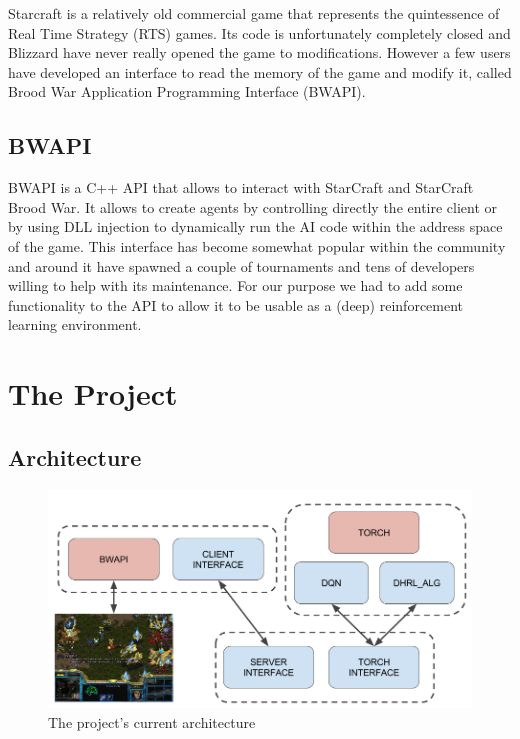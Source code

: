 \documentclass[bsc,frontabs,twoside,singlespacing,parskip,deptreport]{infthesis}     %
\begin{document}
Starcraft is a relatively old commercial game that represents the quintessence
of Real Time Strategy (RTS) games. Its code is unfortunately completely closed
and Blizzard have never really opened the game to modifications. However a few
users have developed an interface to read the memory of the game and modify it,
called Brood War Application Programming Interface (BWAPI).

\section{BWAPI}

BWAPI is a C++ API that allows to interact with StarCraft and StarCraft Brood
War. It allows to create agents by controlling directly the entire client or by
using DLL injection to dynamically run the AI code within the address space of
the game. This interface has become somewhat popular within the community and
around it have spawned a couple of tournaments and tens of developers willing to
help with its maintenance. For our purpose we had to add some functionality to
the API to allow it to be usable as a (deep) reinforcement learning environment.

\chapter{The Project}

\section{Architecture}

\begin{figure}[h]
    \centering
    \includegraphics[width=\textwidth]{architecture}
    \caption{The project's current architecture}
    \label{fig:arch}
\end{figure}
\end{document}
